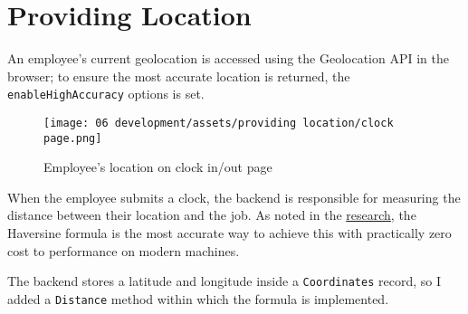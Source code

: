 \section{Providing Location}

An employee's current geolocation is accessed using the
Geolocation API in the browser; to ensure the most accurate
location is returned, the \lstinline{enableHighAccuracy}
options is set.

\begin{figure}
  \centering
  \texttt{[image: 06
    development/assets/providing location/clock page.png]}
  \caption{Employee's location on clock in/out page}
\end{figure}

When the employee submits a clock, the backend is
responsible for measuring the distance between their
location and the job.
As noted in the \hyperref[ss:coordSystems]{research}, the
Haversine formula is the most accurate way to achieve this
with practically zero cost to performance on modern
machines.

The backend stores a latitude and longitude inside a
\lstinline{Coordinates} record, so I added a
\lstinline{Distance} method within which the formula is
implemented. 